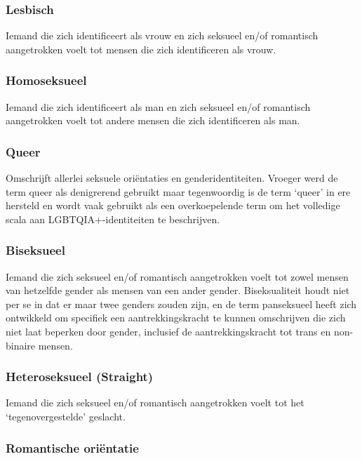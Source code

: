 \documentclass[12pt,openany]{book}
\begin{document}
\subsubsection*{Lesbisch}

Iemand die zich identificeert als vrouw en zich seksueel en/of romantisch aangetrokken voelt tot mensen die zich identificeren als vrouw.

\subsubsection*{Homoseksueel}

Iemand die zich identificeert als man en zich seksueel en/of romantisch aangetrokken voelt tot andere mensen die zich identificeren als man.

\subsubsection*{Queer}

Omschrijft allerlei seksuele oriëntaties en genderidentiteiten. Vroeger werd de term queer als denigrerend gebruikt maar tegenwoordig is de term `queer' in ere hersteld en wordt vaak gebruikt als een overkoepelende term om het volledige scala aan LGBTQIA+-identiteiten te beschrijven.  

\subsubsection*{Biseksueel}

Iemand die zich seksueel en/of romantisch aangetrokken voelt tot zowel mensen van hetzelfde gender als mensen van een ander gender. Biseksualiteit houdt niet per se in dat er maar twee genders zouden zijn, en de term panseksueel heeft zich ontwikkeld om specifiek een aantrekkingskracht te kunnen omschrijven die zich niet laat beperken door gender, inclusief de aantrekkingskracht tot trans en non-binaire mensen.

\subsubsection*{Heteroseksueel (Straight)}

Iemand die zich seksueel en/of romantisch aangetrokken voelt tot het `tegenovergestelde' geslacht.

\subsubsection*{Romantische oriëntatie}
\end{document}
